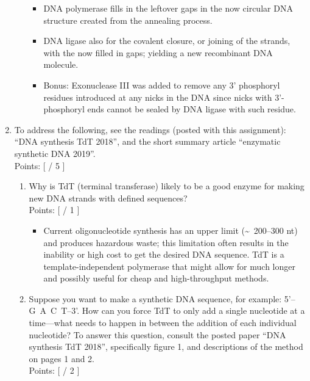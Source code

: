 \documentclass[basic]{inVerba-notes}
\begin{document}
\begin{enumerate}
\begin{enumerate}
    \begin{itemize}\color{text}
      \item DNA polymerase fills in the leftover gaps in the now circular DNA structure created from the annealing process. 
      \item DNA ligase also for the covalent closure, or joining of the strands, with the now filled in gaps; yielding a new recombinant DNA molecule.
      \item Bonus: Exonuclease III was added to remove any 3' phosphoryl residues introduced at any nicks in the DNA since nicks with 3'-phosphoryl ends cannot be sealed by DNA ligase with such residue. 
    \end{itemize}
  \end{enumerate}
  \item To address the following, see the readings (posted with this assignment): “DNA synthesis TdT 2018”, and the short summary article “enzymatic synthetic DNA 2019”. 
  \\ Points: [ \hspace{14pt} / 5 ] \smallskip
  \begin{enumerate}
    \item Why is TdT (terminal transferase) likely to be a good enzyme for making new DNA strands with defined sequences? 
    \\ Points: [ \hspace{14pt} / 1 ] \smallskip

    \begin{itemize}\color{text}
      \item Current oligonucleotide synthesis has an upper limit (\sim~200--300 nt) and produces hazardous waste; this limitation often results in the inability or high cost to get the desired DNA sequence. TdT is a template-independent polymerase that might allow for much longer and possibly useful for cheap and high-throughput methods. 
    \end{itemize}

    \item Suppose you want to make a synthetic DNA sequence, for example: 5’--G~A~C~T--3’. How can you force TdT to only add a single nucleotide at a time---what needs to happen in between the addition of each individual nucleotide? To answer this question, consult the posted paper “DNA synthesis TdT 2018”, specifically figure 1, and descriptions of the method on pages 1 and 2. 
    \\ Points: [ \hspace{14pt} / 2 ] \smallskip


\end{enumerate}
\end{enumerate}
\end{document}
